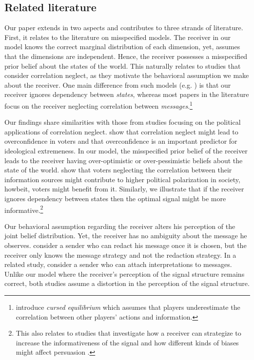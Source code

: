 \documentclass[12pt,english]{article}
\theoremstyle{plain}
\begin{document}
\subsection{Related literature}
Our paper extends \cite{kamenica2011bayesian} in two aspects and contributes to three strands of literature. 
First, it relates to the literature on misspecified models. 
The receiver in our model knows the correct marginal distribution of each dimension, yet, assumes that the dimensions are independent.
Hence, the receiver possesses a misspecified prior belief about the states of the world. 
This naturally relates to studies that consider correlation neglect, as they motivate the behavioral assumption we make about the receiver. 
One main difference from such models (e.g. \cite*{levy2022persuasion}) is that our receiver ignores dependency between \emph{states}, whereas most papers in the literature focus on the receiver neglecting correlation between \emph{messages}.\footnote{\cite{eyster2005cursed} introduce \emph{cursed equilibrium} which assumes that players underestimate the correlation between other players' actions and information.} 

Our findings share similarities with those from studies focusing on the political applications of correlation neglect. 
\cite{ortoleva2015overconfidence} show that correlation neglect might lead to overconfidence in voters and that overconfidence is an important predictor for ideological extremeness. 
In our model, the misspecified prior belief of the receiver leads to the receiver having over-optimistic or over-pessimistic beliefs about the state of the world.  
\cite{levy2015correlation} show that voters neglecting the correlation between their information sources might contribute to higher political polarization in society, howbeit, voters might benefit from it.
Similarly, we illustrate that if the receiver ignores dependency between states then the optimal signal might be more informative.\footnote{This also relates to studies that investigate how a receiver can strategize to increase the informativeness of the signal \citep*{austen2000cheap,kartik2007note,ambrus2017delegation,tsakas2021resisting} and how different kinds of biases might affect persuasion \citep*{hagmann2017persuasion,augias2020persuading,de2022non}.} 

Our behavioral assumption regarding the receiver alters his perception of the joint belief distribution.
Yet, the receiver has no ambiguity about the message he observes. 
\cite*{eliaz2021persuasion} consider a sender who can redact his message once it is chosen, but the receiver only knows the message strategy and not the redaction strategy. 
In a related study, \cite*{eliaz2021strategic} consider a sender who can attach interpretations to messages. 
Unlike our model where the receiver's perception of the signal structure remains correct, both studies assume a distortion in the perception of the signal structure. 
\end{document}
